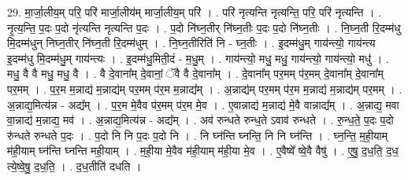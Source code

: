 \documentclass[17pt]{extarticle}
\begin{document}
29. मा॒र्जा॒लीय॒म् परि॒ परि॑ मार्जा॒लीय॑म् मार्जा॒लीय॒म् परि॑ । . परि॑ नृत्यन्ति नृत्यन्ति॒ परि॒ परि॑ नृत्यन्ति । . नृ॒त्य॒न्ति॒ प॒दः प॒दो नृ॑त्यन्ति नृत्यन्ति प॒दः । . प॒दो नि॑घ्न॒तीर् नि॑घ्न॒तीः प॒दः प॒दो नि॑घ्न॒तीः । . नि॒घ्न॒ती रि॒दम्म॑धु मि॒दम्म॑धुन् निघ्न॒तीर् नि॑घ्न॒ती रि॒दम्म॑धुम् । . नि॒घ्न॒तीरिति॑ नि - घ्न॒तीः । . इ॒दम्म॑धु॒म् गाय॑न्त्यो॒ गाय॑न्त्य इ॒दम्म॑धु मि॒दम्म॑धु॒म् गाय॑न्त्यः । . इ॒दम्म॑धु॒मिती॒दं - म॒धु॒म् । . गाय॑न्त्यो॒ मधु॒ मधु॒ गाय॑न्त्यो॒ गाय॑न्त्यो॒ मधु॑ । . मधु॒ वै वै मधु॒ मधु॒ वै । . वै दे॒वाना᳚म् दे॒वानां॒ ॅवै वै दे॒वाना᳚म् । . दे॒वाना᳚म् पर॒मम् प॑र॒मम् दे॒वाना᳚म् दे॒वाना᳚म् पर॒मम् । . प॒र॒म म॒न्नाद्य॑ म॒न्नाद्य॑म् पर॒मम् प॑र॒म म॒न्नाद्य᳚म् । . अ॒न्नाद्य॑म् पर॒मम् प॑र॒म म॒न्नाद्य॑ म॒न्नाद्य॑म् पर॒मम् । . अ॒न्नाद्य॒मित्य॑न्न - अद्य᳚म् । . प॒र॒म मे॒वैव प॑र॒मम् प॑र॒म मे॒व । . ए॒वान्नाद्य॑ म॒न्नाद्य॑ मे॒वै वान्नाद्य᳚म् । . अ॒न्नाद्य॒ मवा वा॒न्नाद्य॑ म॒न्नाद्य॒ मव॑ । . अ॒न्नाद्य॒मित्य॑न्न - अद्य᳚म् । . अव॑ रुन्धते रुन्ध॒ते ऽवाव॑ रुन्धते । . रु॒न्ध॒ते॒ प॒दः प॒दो रु॑न्धते रुन्धते प॒दः । . प॒दो नि नि प॒दः प॒दो नि । . नि घ्न॑न्ति घ्नन्ति॒ नि नि घ्न॑न्ति । . घ्न॒न्ति॒ म॒ही॒याम् म॑ही॒याम् घ्न॑न्ति घ्नन्ति मही॒याम् । . म॒ही॒या मे॒वैव म॑ही॒याम् म॑ही॒या मे॒व । . ए॒वैष्वे᳚ ष्वे॒वै वैषु॑ । . ए॒षु॒ द॒ध॒ति॒ द॒ध॒ त्ये॒ष्वे॒षु॒ द॒ध॒ति॒ । . द॒ध॒तीति॑ दधति । \newline
\end{document}
